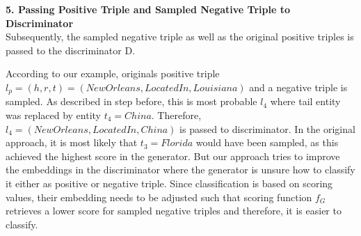 \textbf{5. Passing Positive Triple and Sampled Negative Triple to Discriminator}\\
Subsequently, the sampled negative triple as well as the original positive triples is passed to the discriminator D.

According to our example, originals positive triple $l_p = (h,r,t) = (NewOrleans, LocatedIn, Louisiana)$ and a negative triple is sampled.
As described in step before, this is most probable $l_4$ where tail entity was replaced by entity $t_4 = China$.
Therefore, $l_4 = (NewOrleans, LocatedIn, China)$ is passed to discriminator.
In the original approach, it is most likely that $t_3 = Florida$ would have been sampled, as this achieved the highest score in the generator.
But our approach tries to improve the embeddings in the discriminator where the generator is unsure how to classify it either as positive or negative triple.
Since classification is based on scoring values, their embedding needs to be adjusted such that scoring function $f_G$ retrieves a lower score for sampled negative triples and therefore, it is easier to classify.



